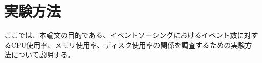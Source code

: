 \documentclass[../../main]{subfiles}
\begin{document}
    \section{実験方法}\label{sec:method}

    ここでは、本論文の目的である、イベントソーシングにおけるイベント数に対するCPU使用率、メモリ使用率、ディスク使用率の関係を調査するための実験方法について説明する。

    

    

    

    

    
\end{document}
